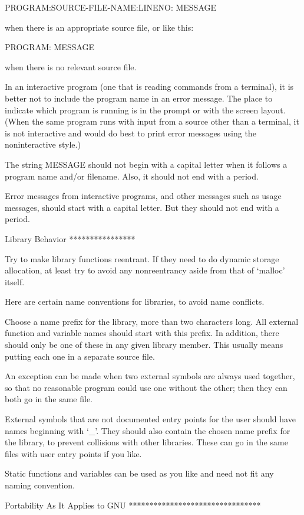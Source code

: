      PROGRAM:SOURCE-FILE-NAME:LINENO: MESSAGE

when there is an appropriate source file, or like this:

     PROGRAM: MESSAGE

when there is no relevant source file.

   In an interactive program (one that is reading commands from a
terminal), it is better not to include the program name in an error
message.  The place to indicate which program is running is in the
prompt or with the screen layout.  (When the same program runs with
input from a source other than a terminal, it is not interactive and
would do best to print error messages using the noninteractive style.)

   The string MESSAGE should not begin with a capital letter when it
follows a program name and/or filename.  Also, it should not end with a
period.

   Error messages from interactive programs, and other messages such as
usage messages, should start with a capital letter.  But they should not
end with a period.

Library Behavior
****************

   Try to make library functions reentrant.  If they need to do dynamic
storage allocation, at least try to avoid any nonreentrancy aside from
that of `malloc' itself.

   Here are certain name conventions for libraries, to avoid name
conflicts.

   Choose a name prefix for the library, more than two characters long.
All external function and variable names should start with this prefix.
In addition, there should only be one of these in any given library
member.  This usually means putting each one in a separate source file.

   An exception can be made when two external symbols are always used
together, so that no reasonable program could use one without the
other; then they can both go in the same file.

   External symbols that are not documented entry points for the user
should have names beginning with `_'.  They should also contain the
chosen name prefix for the library, to prevent collisions with other
libraries.  These can go in the same files with user entry points if
you like.

   Static functions and variables can be used as you like and need not
fit any naming convention.

Portability As It Applies to GNU
********************************

